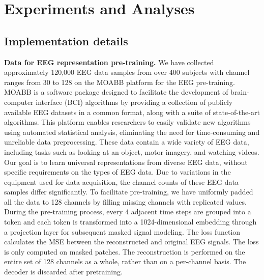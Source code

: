 \documentclass[10pt,twocolumn,letterpaper]{article}
\begin{document}

\section{Experiments and Analyses}
\subsection{Implementation details}

\noindent\textbf{Data for EEG representation pre-training.} We have collected approximately 120,000 EEG data samples from over 400 subjects with channel ranges from 30 to 128 on the MOABB \cite{jayaram2018moabb} platform for the EEG pre-training. MOABB is a software package designed to facilitate the development of brain-computer interface (BCI) algorithms by providing a collection of publicly available EEG datasets in a common format, along with a suite of state-of-the-art algorithms. This platform enables researchers to easily validate new algorithms using automated statistical analysis, eliminating the need for time-consuming and unreliable data preprocessing. These data contain a wide variety of EEG data, including tasks such as looking at an object, motor imagery, and watching videos. Our goal is to learn universal representations from diverse EEG data, without specific requirements on the types of EEG data. Due to variations in the equipment used for data acquisition, the channel counts of these EEG data samples differ significantly. To facilitate pre-training, we have uniformly padded all the data to 128 channels by filling missing channels with replicated values. During the pre-training process, every 4 adjacent time steps are grouped into a token and each token is transformed into a 1024-dimensional embedding through a projection layer for subsequent masked signal modeling. The loss function calculates the MSE between the reconstructed and original EEG signals. The loss is only computed on masked patches. The reconstruction is performed on the entire set of 128 channels as a whole, rather than on a per-channel basis. The decoder is discarded after pretraining.
\end{document}
